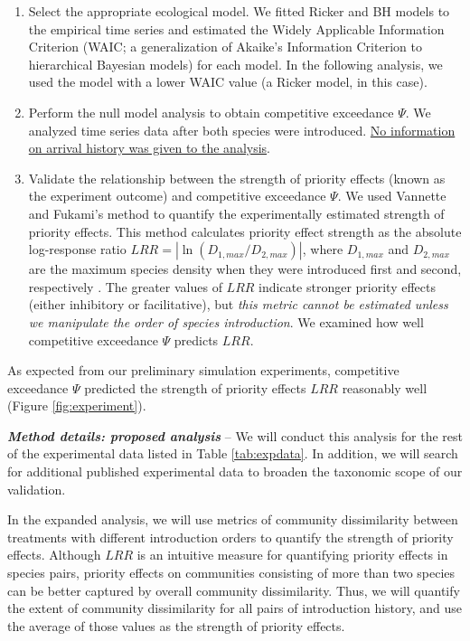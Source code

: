 \documentclass[12pt, class=article, crop=false]{standalone}
\begin{document}
\begin{enumerate}
    \item Select the appropriate ecological model.
    We fitted Ricker and BH models to the empirical time series and estimated the Widely Applicable Information Criterion (WAIC; a generalization of Akaike's Information Criterion to hierarchical Bayesian models) \citep{watanabe_widely_2013} for each model.
    In the following analysis, we used the model with a lower WAIC value (a Ricker model, in this case).
    \item Perform the null model analysis to obtain competitive exceedance $\Psi$.
    We analyzed time series data after both species were introduced.
    \ul{No information on arrival history was given to the analysis}.
    \item Validate the relationship between the strength of priority effects (known as the experiment outcome) and competitive exceedance $\Psi$.
    We used Vannette and Fukami's method \citep{vannette_historical_2014} to quantify the experimentally estimated strength of priority effects.
    This method calculates priority effect strength as the absolute log-response ratio $LRR = |\ln (D_{1, max} / D_{2, max})|$, where $D_{1, max}$ and $D_{2, max}$ are the maximum species density when they were introduced first and second, respectively \citep{hsu_metabolic_2021}.
    The greater values of $LRR$ indicate stronger priority effects (either inhibitory or facilitative), but \textit{this metric cannot be estimated unless we manipulate the order of species introduction}.
    We examined how well competitive exceedance $\Psi$ predicts $LRR$.
\end{enumerate}

As expected from our preliminary simulation experiments, competitive exceedance $\Psi$ predicted the strength of priority effects $LRR$ reasonably well (Figure \ref{fig:experiment}).

\textit{\textbf{Method details: proposed analysis}} --
We will conduct this analysis for the rest of the experimental data listed in Table \ref{tab:expdata}.
In addition, we will search for additional published experimental data to broaden the taxonomic scope of our validation.

In the expanded analysis, we will use metrics of community dissimilarity between treatments with different introduction orders to quantify the strength of priority effects.
Although $LRR$ is an intuitive measure for quantifying priority effects in species pairs, priority effects on communities consisting of more than two species can be better captured by overall community dissimilarity.
Thus, we will quantify the extent of community dissimilarity for all pairs of introduction history, and use the average of those values as the strength of priority effects.
\end{document}
